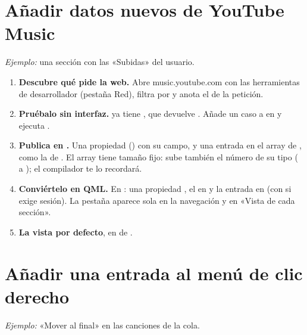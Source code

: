\section{Añadir datos nuevos de YouTube Music}

\emph{Ejemplo:} una sección con las «Subidas» del usuario.

\begin{enumerate}
  \item \textbf{Descubre qué pide la web.} Abre music.youtube.com con las herramientas de
  desarrollador (pestaña Red), filtra por  y anota el  de la petición.
  \item \textbf{Pruébalo sin interfaz.}  ya tiene ,
  que devuelve . Añade un caso a  en  y ejecuta
  .
  \item \textbf{Publica en .} Una propiedad ()
  con su campo, y una entrada en el array  de , como la de
  . El array tiene tamaño fijo: sube también el número de su tipo
  (\cod{[...; 5]} a \cod{[...; 6]}); el compilador te lo recordará.
  \item \textbf{Conviértelo en QML.} En : una propiedad
  , el  en  y la entrada
  en  (con  si exige sesión). La pestaña aparece sola en la
  navegación y en «Vista de cada sección».
  \item \textbf{La vista por defecto}, en  de .
\end{enumerate}

\section{Añadir una entrada al menú de clic derecho}

\emph{Ejemplo:} «Mover al final» en las canciones de la cola.

